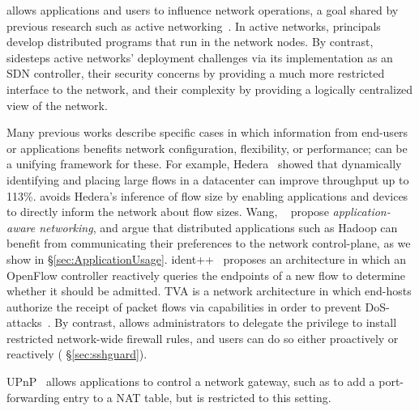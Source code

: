 %
\sys allows applications and users to influence
network operations, a goal shared by previous research such as
active networking~\cite{ActiveNetworking}. In active networks, principals
develop distributed programs that run in the network nodes. By contrast,
\sys sidesteps active networks' deployment challenges via its implementation
as an SDN controller, their security concerns by providing a much more restricted
interface to the network, and their complexity by providing a logically centralized
view of the network.

%
Many previous works describe specific cases in which information
from end-users or applications benefits network configuration,
flexibility, or performance; \sys can be a unifying framework for
these.  For example, Hedera~\cite{alfares10hedera} showed that
dynamically identifying and placing large flows in a datacenter can
improve throughput up to 113\%. \sys avoids Hedera's
inference of flow size by enabling applications and devices to
directly inform the network about flow sizes. 
Wang, \etal~\cite{Wang:2012} propose \emph{application-aware networking},
and argue
that distributed applications such as Hadoop can benefit from
communicating their preferences to the network control-plane, as we
show in \S\ref{sec:ApplicationUsage}.
%
ident++~\cite{naous09ident++}
proposes an architecture in which an OpenFlow controller reactively
queries the endpoints of a new flow to determine whether it should
be admitted. 
TVA is a network architecture in which end-hosts authorize the receipt
of packet flows via capabilities in order to prevent DoS-attacks~\cite{Yang:2005}.
By contrast, \sys allows administrators to delegate the
privilege to install restricted network-wide firewall rules, and
users can do so either proactively or reactively (\cf
\S\ref{sec:sshguard}).  


UPnP~\cite{upnp}
allows applications to control a network gateway, such as to add a
port-forwarding entry to a NAT table, but is restricted to this setting.

